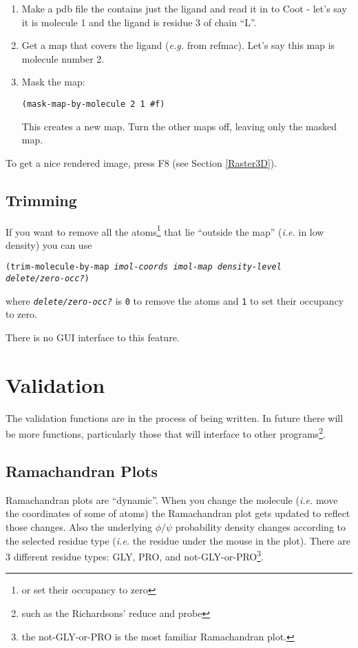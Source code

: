 \documentclass{book}
\begin{document}
\begin{enumerate}
\item Make a pdb file the contains just the ligand and read it in to
  Coot - let's say it is molecule 1 and the ligand is residue 3 of
  chain ``L''.
\item Get a map that covers the ligand (\emph{e.g.} from refmac).
  Let's say this map is molecule number 2.
\item Mask the map:

\texttt{(mask-map-by-molecule 2 1 \#f)}

This creates a new map.  Turn the other maps off, leaving only the
masked map.

\end{enumerate}

To get a nice rendered image, press F8 (see Section \ref{Raster3D}).


\section{Trimming}
If you want to remove all the atoms\footnote{or set their occupancy to
  zero} that lie ``outside the map'' (\emph{i.e.} in low density) you can use

\texttt{(trim-molecule-by-map \emph{imol-coords imol-map density-level\\ delete/zero-occ?})}

where \texttt{\emph{delete/zero-occ?}} is \texttt{0} to remove the atoms and
\texttt{1} to set their occupancy to zero.

There is no GUI interface to this feature.


\chapter{Validation}

The validation functions are in the process of being written.  In
future there will be more functions, particularly those that will
interface to other programs\footnote{such as the Richardsons' reduce
  and probe}.

\section{Ramachandran Plots}
 Ramachandran plots are ``dynamic''.  When
you change the molecule (\emph{i.e.} move the coordinates of some of
atoms) the Ramachandran plot gets updated to reflect those changes.
Also the underlying $\phi/\psi$ probability density changes according
to the selected residue type (\emph{i.e.} the residue under the mouse
in the plot).  There are 3 different residue types: GLY, PRO, and
not-GLY-or-PRO\footnote{the not-GLY-or-PRO is the most familiar
  Ramachandran plot.}.
\end{document}
